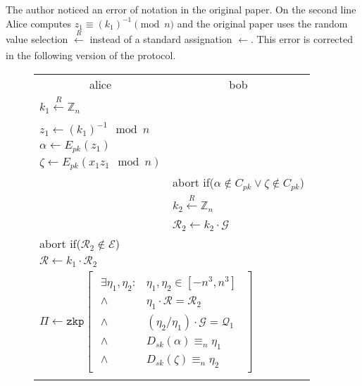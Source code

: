 The author noticed an error of notation in the original paper. On the second
line Alice computes $z_1 \equiv (k_1)^{-1} \pmod n$ and the original paper uses
the random value selection $\xleftarrow[]{R}$ instead of a standard assignation
$\leftarrow$. This error is corrected in the following version of the protocol.

\newpage

\begin{figure}[H]
    \begin{table}[H]
      \centering
      \begin{footnotesize}
      {\renewcommand{\arraystretch}{1.2}%
      \begin{tabular}{ | l l | }
        \hline
        \multicolumn{1}{|c}{alice}  & \multicolumn{1}{c|}{bob} \\
        $k_1 \xleftarrow[]{R} \mathbb{Z}_{n}$ & \\
        $z_1 \leftarrow (k_1)^{-1} \mod n$ & \\
        $\alpha \leftarrow E_{pk}(z_1)$ & \\
        $\zeta \leftarrow E_{pk}(x_1z_1 \mod n)$ & \\[2ex]
          & abort if($\alpha \notin C_{pk} \lor \zeta \notin C_{pk}$) \\
          & $k_2 \xleftarrow[]{R} \mathbb{Z}_{n}$ \\
          & $\mathcal{R}_2 \leftarrow k_2 \cdot \mathcal{G}$ \\[2ex]
        abort if($\mathcal{R}_2 \notin \mathcal{E}$) & \\
        $\mathcal{R} \leftarrow k_1 \cdot \mathcal{R}_2$ & \\
        \multicolumn{2}{|l|}{
        $\Pi \leftarrow \texttt{zkp} \begin{bmatrix}\begin{array}{lr}
                                      \exists \eta_1, \eta_2 : & \eta_1, \eta_2 \in [-n^3, n^3] \\
                                      \land & \eta_1 \cdot \mathcal{R} = \mathcal{R}_2 \\
                                      \land & (\eta_2/\eta_1) \cdot \mathcal{G} = \mathcal{Q}_1 \\
                                      \land & D_{sk}(\alpha) \equiv_n \eta_1 \\
                                      \land & D_{sk}(\zeta) \equiv_n \eta_2
                                     \end{array}\end{bmatrix}$ } \\ & \\

\end{tabular}}
\end{footnotesize}
\end{table}
\end{figure}
